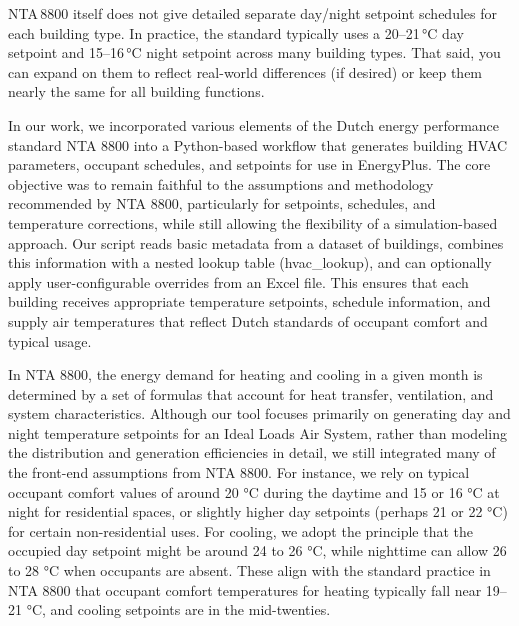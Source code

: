 NTA 8800 itself does not give detailed separate day/night setpoint schedules for each building type. In practice, the standard typically uses a 20–21 °C day setpoint and 15–16 °C night setpoint across many building types. That said, you can expand on them to reflect real-world differences (if desired) or keep them nearly the same for all building functions.

   
In our work, we incorporated various elements of the Dutch energy performance standard NTA 8800 into a Python-based workflow that generates building HVAC parameters, occupant schedules, and setpoints for use in EnergyPlus. The core objective was to remain faithful to the assumptions and methodology recommended by NTA 8800, particularly for setpoints, schedules, and temperature corrections, while still allowing the flexibility of a simulation-based approach. Our script reads basic metadata from a dataset of buildings, combines this information with a nested lookup table (hvac_lookup), and can optionally apply user-configurable overrides from an Excel file. This ensures that each building receives appropriate temperature setpoints, schedule information, and supply air temperatures that reflect Dutch standards of occupant comfort and typical usage.

In NTA 8800, the energy demand for heating and cooling in a given month is determined by a set of formulas that account for heat transfer, ventilation, and system characteristics. Although our tool focuses primarily on generating day and night temperature setpoints for an Ideal Loads Air System, rather than modeling the distribution and generation efficiencies in detail, we still integrated many of the front-end assumptions from NTA 8800. For instance, we rely on typical occupant comfort values of around 20 °C during the daytime and 15 or 16 °C at night for residential spaces, or slightly higher day setpoints (perhaps 21 or 22 °C) for certain non-residential uses. For cooling, we adopt the principle that the occupied day setpoint might be around 24 to 26 °C, while nighttime can allow 26 to 28 °C when occupants are absent. These align with the standard practice in NTA 8800 that occupant comfort temperatures for heating typically fall near 19–21 °C, and cooling setpoints are in the mid-twenties.

